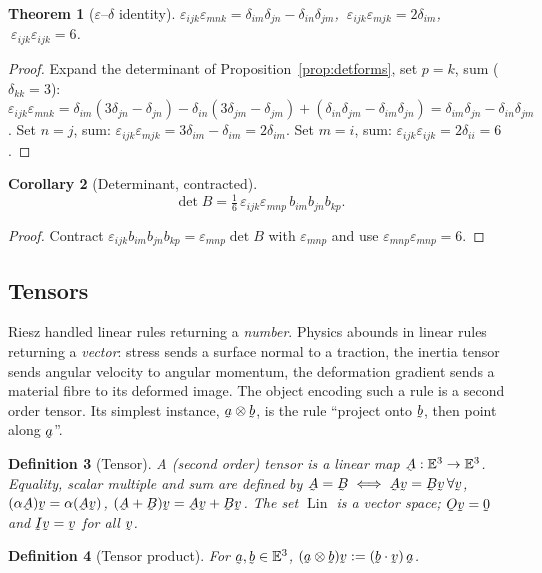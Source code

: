 \documentclass[17pt,a4paper]{extreport}
\DeclareRobustCommand{\vek}[1]{\underaccent{\tilde}{#1}}
\newcommand{\Et}{\mathbb{E}^{3}}
\newcommand{\Lin}{\operatorname{Lin}}
\newcommand{\I}{\vek{I}}
\newcommand{\Ob}{\vek{O}}
\newcommand{\ba}{\vek{a}}
\newcommand{\bb}{\vek{b}}
\newcommand{\bv}{\vek{v}}
\newcommand{\bze}{\vek{0}}
\newcommand{\bA}{\vek{A}}
\newcommand{\bB}{\vek{B}}
\newcommand{\dd}{\delta}
\newcommand{\eps}{\varepsilon}
\newcommand{\ip}[2]{#1\cdot#2}
\theoremstyle{scplain}
\newtheorem{theorem}{Theorem}[chapter]
\newtheorem{corollary}[theorem]{Corollary}
\theoremstyle{scdefn}
\newtheorem{definition}[theorem]{Definition}
\theoremstyle{scplain}
\begin{document}
\begin{theorem}[$\eps$--$\dd$ identity]\label{thm:epsdelta}
$\eps_{ijk}\eps_{mnk}=\dd_{im}\dd_{jn}-\dd_{in}\dd_{jm}$,
$\ \eps_{ijk}\eps_{mjk}=2\dd_{im}$, $\ \eps_{ijk}\eps_{ijk}=6$.
\end{theorem}

\begin{proof}
Expand the determinant of Proposition~\ref{prop:detforms}, set $p=k$, sum
($\dd_{kk}=3$):
$\eps_{ijk}\eps_{mnk}=\dd_{im}(3\dd_{jn}-\dd_{jn})-\dd_{in}(3\dd_{jm}
-\dd_{jm})+(\dd_{in}\dd_{jm}-\dd_{im}\dd_{jn})
=\dd_{im}\dd_{jn}-\dd_{in}\dd_{jm}$. Set $n=j$, sum:
$\eps_{ijk}\eps_{mjk}=3\dd_{im}-\dd_{im}=2\dd_{im}$. Set $m=i$, sum:
$\eps_{ijk}\eps_{ijk}=2\dd_{ii}=6$.
\end{proof}

\begin{corollary}[Determinant, contracted]\label{cor:det6}
\[\det B=\tfrac16\,\eps_{ijk}\eps_{mnp}\,b_{im}b_{jn}b_{kp}.\]
\end{corollary}

\begin{proof}
Contract $\eps_{ijk}b_{im}b_{jn}b_{kp}=\eps_{mnp}\det B$ with
$\eps_{mnp}$ and use $\eps_{mnp}\eps_{mnp}=6$.
\end{proof}

\subsection{Tensors}\label{ss:tensor}

Riesz handled linear rules returning a \emph{number}. Physics abounds in
linear rules returning a \emph{vector}: stress sends a surface normal to a
traction, the inertia tensor sends angular velocity to angular momentum,
the deformation gradient sends a material fibre to its deformed image. The
object encoding such a rule is a second order tensor. Its simplest instance,
$\ba\otimes\bb$, is the rule ``project onto $\bb$, then point along $\ba$''.

\begin{definition}[Tensor]\label{def:tensor}
A (second order) tensor is a linear map $\bA:\Et\to\Et$. Equality, scalar
multiple and sum are defined by $\bA=\bB\iff\bA\bv=\bB\bv\,\forall\bv$,
$(\alpha\bA)\bv=\alpha(\bA\bv)$, $(\bA+\bB)\bv=\bA\bv+\bB\bv$. The set $\Lin$
is a vector space; $\Ob\bv=\bze$ and $\I\bv=\bv$ for all $\bv$.
\end{definition}

\begin{definition}[Tensor product]\label{def:tp}
For $\ba,\bb\in\Et$, $(\ba\otimes\bb)\bv:=(\ip\bb\bv)\,\ba$.
\end{definition}
\end{document}
